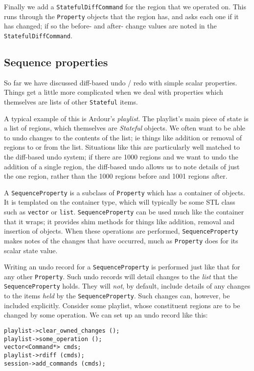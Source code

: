 \documentclass[10pt,a4paper]{book}
\newcommand{\code}[1]{\texttt{#1}}
\begin{document}
Finally we add a \code{StatefulDiffCommand} for the region that we
operated on.  This runs through the \code{Property} objects that the
region has, and asks each one if it has changed; if so the before- and
after- change values are noted in the \code{StatefulDiffCommand}.


\subsection{Sequence properties}

So far we have discussed diff-based undo / redo with simple scalar
properties.  Things get a little more complicated when we deal with
properties which themselves are lists of other \code{Stateful} items.

A typical example of this is Ardour's \emph{playlist}.  The playlist's
main piece of state is a list of regions, which themselves are
\emph{Stateful} objects.  We often want to be able to undo changes to
the contents of the list; ie things like addition or removal of
regions to or from the list.  Situations like this are particularly
well matched to the diff-based undo system; if there are 1000 regions
and we want to undo the addition of a single region, the diff-based
undo allows us to note details of just the one region, rather than the
1000 regions before and 1001 regions after.

A \code{SequenceProperty} is a subclass of \code{Property} which has a
container of objects.  It is templated on the container type, which
will typically be some STL class such as \code{vector} or \code{list}.
\code{SequenceProperty} can be used much like the container that it
wraps; it provides shim methods for things like addition, removal and
insertion of objects.  When these operations are performed,
\code{SequenceProperty} makes notes of the changes that have occurred,
much as \code{Property} does for its scalar state value.

Writing an undo record for a \code{SequenceProperty} is performed just
like that for any other \code{Property}.  Such undo records will
detail changes to the \emph{list} that the \code{SequenceProperty}
holds.  They will \emph{not}, by default, include details of any
changes to the items \emph{held} by the \code{SequenceProperty}.  Such
changes can, however, be included explicitly.  Consider some playlist,
whose constituent regions are to be changed by some operation.  We can
set up an undo record like this:

\begin{lstlisting}
playlist->clear_owned_changes ();
playlist->some_operation ();
vector<Command*> cmds;
playlist->rdiff (cmds);
session->add_commands (cmds);
\end{lstlisting}
\end{document}
